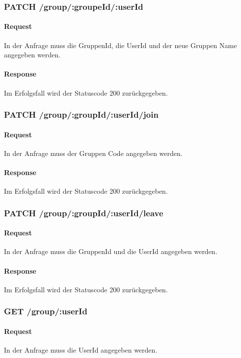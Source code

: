 \documentclass{entwurfsheft}
\begin{document}
\subsubsection*{PATCH /group/:groupeId/:userId}
    \paragraph{Request}
        In der Anfrage muss die GruppenId, die UserId und der neue Gruppen Name angegeben werden.
    \paragraph{Response}
        Im Erfolgsfall wird der Statuscode 200 zurückgegeben.
        
\subsubsection*{PATCH /group/:groupId/:userId/join}
    \paragraph{Request}
        In der Anfrage muss der Gruppen Code angegeben werden.
    \paragraph{Response}
        Im Erfolgsfall wird der Statuscode 200 zurückgegeben.
        
\subsubsection*{PATCH /group/:groupId/:userId/leave}
    \paragraph{Request}
        In der Anfrage muss die GruppenId und die UserId angegeben werden.
    \paragraph{Response}
        Im Erfolgsfall wird der Statuscode 200 zurückgegeben.
    
\subsubsection*{GET /group/:userId}
    \paragraph{Request}
        In der Anfrage muss die UserId angegeben werden.
\end{document}
